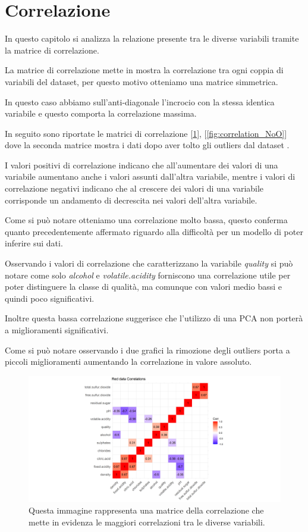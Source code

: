 \section{Correlazione}
In questo capitolo si analizza la relazione presente tra le diverse variabili tramite la matrice di correlazione.

\noindent
La matrice di correlazione mette in mostra la correlazione tra ogni coppia di variabili del dataset, per questo motivo otteniamo una matrice simmetrica.

\noindent
In questo caso abbiamo sull'anti-diagonale l'incrocio con la stessa identica variabile e questo comporta la correlazione massima.

\noindent
In seguito sono riportate le matrici di correlazione [\ref{fig:correlation_O}], [\ref{fig:correlation_NoO}] dove la seconda matrice mostra i dati dopo aver tolto gli outliers dal dataset .

\noindent
I valori positivi di correlazione indicano che all'aumentare dei valori di una variabile aumentano anche i valori assunti dall'altra variabile, mentre i valori di correlazione negativi indicano che al crescere dei valori di una variabile corrisponde un andamento di decrescita nei valori dell'altra variabile.

\noindent
Come si può notare otteniamo una correlazione molto bassa, questo conferma quanto precedentemente affermato riguardo alla difficoltà per un modello di poter inferire sui dati.

\noindent
Osservando i valori di correlazione che caratterizzano la variabile \textit{quality} si può notare come solo \textit{alcohol} e \textit{volatile.acidity} forniscono una correlazione utile per poter distinguere la classe di qualità, ma comunque con valori medio bassi e quindi poco significativi.

\noindent
Inoltre questa bassa correlazione suggerisce che l'utilizzo di una PCA non porterà a miglioramenti significativi.

\noindent
Come si può notare osservando i due grafici la rimozione degli outliers porta a piccoli miglioramenti aumentando la correlazione in valore assoluto.

\newpage

\begin{figure}[H]
    \centering
    \includegraphics[scale=.5]{images/analisi/correlazione/Correlation_matrix_.pngO.png}
    \caption{Questa immagine rappresenta una matrice della correlazione che mette in evidenza le maggiori correlazioni tra le diverse variabili.}
    \label{fig:correlation_O}
\end{figure}


